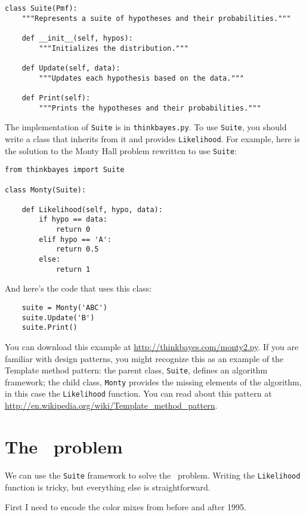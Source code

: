\documentclass[12pt]{book}
\begin{document}
\begin{verbatim}
class Suite(Pmf):
    """Represents a suite of hypotheses and their probabilities."""

    def __init__(self, hypos):
        """Initializes the distribution."""

    def Update(self, data):
        """Updates each hypothesis based on the data."""

    def Print(self):
        """Prints the hypotheses and their probabilities."""
\end{verbatim}

The implementation of \verb"Suite" is in \verb"thinkbayes.py".  To use
\verb"Suite", you should write a class that inherits from it and
provides \verb"Likelihood".  For example, here is the solution to the
Monty Hall problem rewritten to use \verb"Suite":

\begin{verbatim}
from thinkbayes import Suite

class Monty(Suite):

    def Likelihood(self, hypo, data):
        if hypo == data:
            return 0
        elif hypo == 'A':
            return 0.5
        else:
            return 1
\end{verbatim}

And here's the code that uses this class:

\begin{verbatim}
    suite = Monty('ABC')
    suite.Update('B')
    suite.Print()
\end{verbatim}

You can download this example at
\url{http://thinkbayes.com/monty2.py}.  If you are familiar with
design patterns, you might recognize this as an example of the
Template method pattern: the parent class, \verb"Suite", defines an
algorithm framework; the child class, \verb"Monty" provides the
missing elements of the algorithm, in this case the \verb"Likelihood"
function.  You can read about this pattern at
\url{http://en.wikipedia.org/wiki/Template_method_pattern}.


\section{The \MM~problem}

We can use the \verb"Suite" framework to solve the \MM~problem.
Writing the \verb"Likelihood" function is tricky, but everything
else is straightforward.

First I need to encode the color mixes from before and
after 1995.
\end{document}
